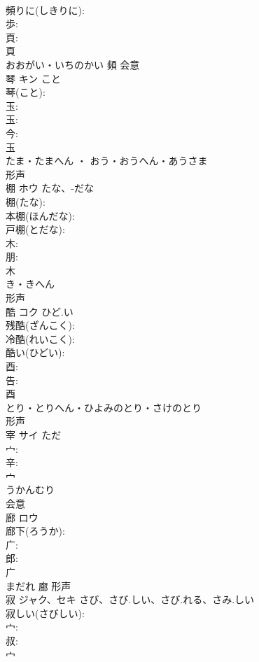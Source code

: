 \documentclass[8pt]{extreport}
\begin{document}
\begin{CJK}{UTF8}{min}
\\	頻りに(しきりに): 
\\	歩: 
\\	頁: 
\\	頁	
\\	おおがい・いちのかい	頻	会意 
\\	琴	キン	こと		
\\	琴(こと): 
\\	玉: 
\\	玉: 
\\	今: 
\\	玉	
\\	たま・たまへん ・ おう・おうへん・あうさま	
\\	形声 
\\	棚	ホウ	たな、-だな		
\\	棚(たな): 
\\	本棚(ほんだな): 
\\	戸棚(とだな): 
\\	木: 
\\	朋: 
\\	木	
\\	き・きへん	
\\	形声 
\\	酷	コク	ひど.い		
\\	残酷(ざんこく): 
\\	冷酷(れいこく): 
\\	酷い(ひどい): 
\\	酉: 
\\	告: 
\\	酉	
\\	とり・とりへん・ひよみのとり・さけのとり	
\\	形声 
\\	宰	サイ		ただ	
\\	宀: 
\\	辛: 
\\	宀	
\\	うかんむり	
\\	会意 
\\	廊	ロウ			
\\	廊下(ろうか): 
\\	广: 
\\	郎: 
\\	广	
\\	まだれ	廊	形声 
\\	寂	ジャク、セキ	さび、さび.しい、さび.れる、さみ.しい		
\\	寂しい(さびしい): 
\\	宀: 
\\	叔: 
\\	宀	

\end{CJK}
\end{document}
